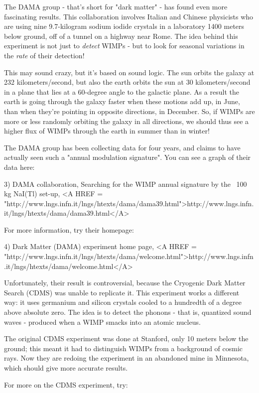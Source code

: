 The DAMA group - that's short for "dark matter" - has found even more
fascinating results.  This collaboration involves Italian and Chinese
physicists who are using nine 9.7-kilogram sodium iodide crystals in a
laboratory 1400 meters below ground, off of a tunnel on a highway near
Rome.  The idea behind this experiment is not just to \emph{detect} WIMPs -
but to look for seasonal variations in the \emph{rate} of their detection!

This may sound crazy, but it's based on sound logic.  The sun orbits the
galaxy at 232 kilometers/second, but also the earth orbits the sun at 30
kilometers/second in a plane that lies at a 60-degree angle to the
galactic plane.  As a result the earth is going through the galaxy
faster when these motions add up, in June, than when they're pointing in
opposite directions, in December.  So, if WIMPs are more or less
randomly orbiting the galaxy in all directions, we should thus see a
higher flux of WIMPs through the earth in summer than in winter!  

The DAMA group has been collecting data for four years, and 
claims to have actually seen such a "annual modulation signature".
You can see a graph of their data here:

3) DAMA collaboration, Searching for the WIMP annual signature by the 
~100 kg NaI(Tl) set-up, <A HREF = "http://www.lngs.infn.it/lngs/htexts/dama/dama39.html">http://www.lngs.infn.it/lngs/htexts/dama/dama39.html</A>

For more information, try their homepage:

4) Dark Matter (DAMA) experiment home page,
<A HREF = "http://www.lngs.infn.it/lngs/htexts/dama/welcome.html">http://www.lngs.infn.it/lngs/htexts/dama/welcome.html</A>

Unfortunately, their result is controversial, because the Cryogenic Dark
Matter Search (CDMS) was unable to replicate it.  This experiment works a
different way: it uses germanium and silicon crystals cooled to a
hundredth of a degree above absolute zero.  The idea is to detect the
phonons - that is, quantized sound waves - produced when a WIMP smacks
into an atomic nucleus.

The original CDMS experiment was done at Stanford, only 10 meters below
the ground; this meant it had to distinguish WIMPs from a background of
cosmic rays.  Now they are redoing the experiment in an abandoned mine
in Minnesota, which should give more accurate results.

For more on the CDMS experiment, try:

